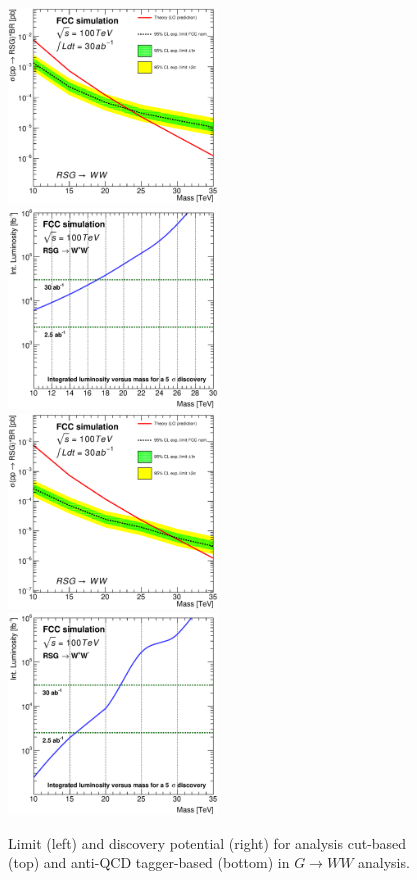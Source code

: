 \documentclass{cernrep}
\begin{document}
\begin{figure}[!htb]\centering
\includegraphics[width=0.495\textwidth]{Fig/RSGww/lim_RSGraviton_ww_fcc_v02_cut.eps}
\includegraphics[width=0.495\textwidth]{Fig/RSGww/DiscoveryPotential_ww_cut_rootStyle.eps}
\includegraphics[width=0.495\textwidth]{Fig/RSGww/lim_RSGraviton_ww_fcc_v02_tagger.eps}
\includegraphics[width=0.495\textwidth]{Fig/RSGww/DiscoveryPotential_ww_tagger_rootStyle.eps}
\caption{Limit (left) and discovery potential (right) for analysis cut-based (top) and anti-QCD tagger-based (bottom) in $G \rightarrow WW$ analysis.}
\label{fig:RSWww_limit}
\end{figure}
\end{document}
